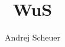 \documentclass[a4paper, fontsize = 7pt, landscape]{scrartcl}
\author{Andrej Scheuer}
\title{WuS}
\subtitle{}
\begin{document}
	\begin{multicols*}{3}
		\thispagestyle{TitlePageStyle}
		\maketitle
		
		
		
		
		
		

		
		
		
		

	\end{multicols*}

\end{document}
